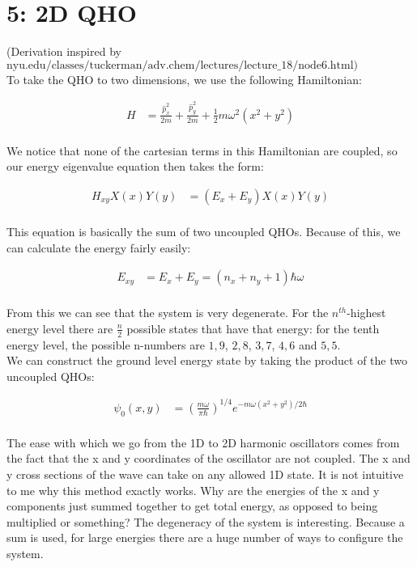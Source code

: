 \documentclass[10pt]{article} %
\begin{document}
\section{5: 2D QHO}
(Derivation inspired by
$\mbox{nyu.edu/classes/tuckerman/adv.chem/lectures/lecture\_18/node6.html)}$\\
To take the QHO to two dimensions, we use the following Hamiltonian:

\begin{align*}
  H &= \frac{\hat{p}_x^2}{2m} + \frac{\hat{p}_y^2}{2m}
  + \frac{1}{2}m\omega^2\left(x^2+y^2\right)\\
\end{align*}

We notice that none of the cartesian terms in this Hamiltonian are coupled, so
our energy eigenvalue equation then takes the form:

\begin{align*}
  H_{xy}X(x)Y(y) &= (E_x + E_y)X(x)Y(y)\\
\end{align*}

This equation is basically the sum of two uncoupled QHOs. Because of this, we
can calculate the energy fairly easily:

\begin{align*}
  E_{xy} &= E_x + E_y = \left(n_x+n_y + 1\right)\hbar\omega\\
\end{align*}

From this we can see that the system is very degenerate. For the $n^{th}$-highest
energy level there are $\frac{n}{2}$ possible states that have that energy: for
the tenth energy level, the possible n-numbers are $1,9$, $2,8$, $3,7$, $4,6$ and
$5,5$.\\

We can construct the ground level energy state by taking the product of the two
uncoupled QHOs:

\begin{align*}
  \psi_0(x,y) &= \left(\frac{m\omega}{\pi\hbar}\right)^{1/4}
  e^{-m\omega\left(x^2+y^2\right)/2\hbar}\\
\end{align*}

The ease with which we go from the 1D to 2D harmonic oscillators comes from the fact
that the x and y coordinates of the oscillator are not coupled. The x and y cross
sections of the wave can take on any allowed 1D state. It is not intuitive to me
why this method exactly works. Why are the energies of the x and y components
just summed together to get total energy, as opposed to being multiplied or
something? The degeneracy of the system is interesting. Because a sum is used,
for large energies there are a huge number of ways to configure the system.\\
\end{document}
